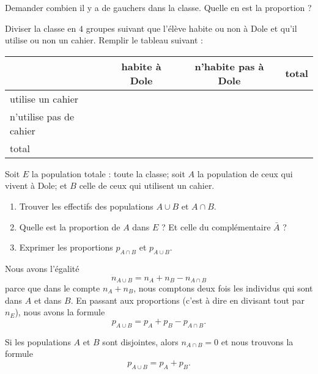 \begin{example}
    Demander combien il y a de gauchers dans la classe. Quelle en est la proportion ?
\end{example}

\begin{example}
    Diviser la classe en \( 4\) groupes suivant que l'élève habite ou non à Dole et qu'il utilise ou non un cahier. Remplir le tableau suivant :

    \begin{center}
    \begin{tabular}{|l||c|c||c|}
        \hline\hline
        & habite à Dole&n'habite pas à Dole&total\\
        \hline
        utilise un cahier&&&\\
        \hline
        n'utilise pas de cahier&&&\\
        \hline\hline
        total&&&\\
        \hline
    \end{tabular}
    \end{center}

    Soit \( E\) la population totale : toute la classe; soit $A$ la population de ceux qui vivent à Dole; et \( B\) celle de ceux qui utilisent un cahier.
    \begin{enumerate}
        \item
            Trouver les effectifs des populations \( A\cup B\) et \( A\cap B\).
        \item
            Quelle est la proportion de \( A\) dans \( E\) ? Et celle du complémentaire \( \bar A\) ?
        \item
            Exprimer les proportions \( p_{A\cap B}\) et \( p_{A\cup B}\).
    \end{enumerate}
\end{example}

Nous avons l'égalité
\begin{equation}
    n_{A\cup B}=n_A+n_B-n_{A\cap B}
\end{equation}
parce que dans le compte \( n_A+n_B\), nous comptons deux fois les individus qui sont dans \( A\) et dans \( B\). En passant aux proportions (c'est à dire en divisant tout par \( n_E\)), nous avons la formule
\begin{equation}
    p_{A\cup B}=p_A+p_B-p_{A\cap B}.
\end{equation}

\begin{remark}
    Si les populations \( A\) et \( B\) sont disjointes, alors \( n_{A\cap B}=0\) et nous trouvons la formule
    \begin{equation}
        p_{A\cup B}=p_A+p_B.
    \end{equation}
\end{remark}


